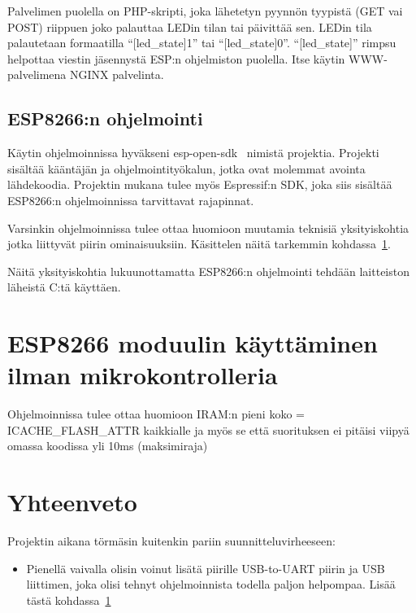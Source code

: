 Palvelimen puolella on PHP-skripti, joka lähetetyn pyynnön tyypistä (GET vai
POST) riippuen joko palauttaa LEDin tilan tai päivittää sen. LEDin tila
palautetaan formaatilla ``[led\_state]1'' tai ``[led\_state]0''.
``[led\_state]'' rimpsu helpottaa viestin jäsennystä ESP:n ohjelmiston
puolella. Itse käytin WWW-palvelimena NGINX palvelinta.

\subsection{ESP8266:n ohjelmointi}
Käytin ohjelmoinnissa hyväkseni esp-open-sdk~\cite{esp-open-sdk} nimistä
projektia. Projekti sisältää kääntäjän ja ohjelmointityökalun, jotka ovat
molemmat avointa lähdekoodia. Projektin mukana tulee myös Espressif:n SDK, joka
siis sisältää ESP8266:n ohjelmoinnissa tarvittavat rajapinnat.

Varsinkin ohjelmoinnissa tulee ottaa huomioon muutamia teknisiä yksityiskohtia
jotka liittyvät piirin ominaisuuksiin. Käsittelen näitä tarkemmin
kohdassa~\ref{sec:extra}.

Näitä yksityiskohtia lukuunottamatta ESP8266:n ohjelmointi tehdään laitteiston
läheistä C:tä käyttäen.

\section{ESP8266 moduulin käyttäminen ilman mikrokontrolleria}
\label{sec:extra}

Ohjelmoinnissa tulee ottaa huomioon IRAM:n pieni koko = ICACHE\_FLASH\_ATTR
kaikkialle ja myös se että suorituksen ei pitäisi viipyä omassa koodissa yli
10ms (maksimiraja)

\section{Yhteenveto}

Projektin aikana törmäsin kuitenkin pariin suunnitteluvirheeseen:
\begin{itemize}
  \item Pienellä vaivalla olisin voinut lisätä piirille USB-to-UART piirin ja
    USB liittimen, joka olisi tehnyt ohjelmoinnista todella paljon helpompaa.
    Lisää tästä kohdassa~\ref{sec:extra}
\end{itemize}

